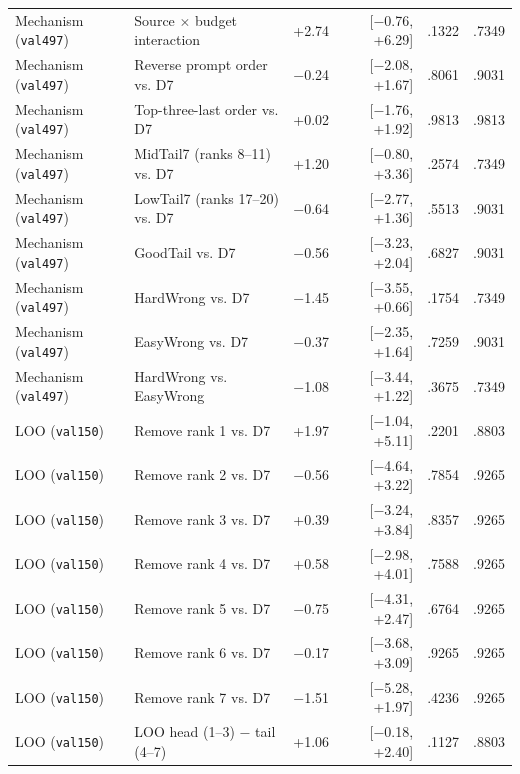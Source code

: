 \documentclass[11pt,a4paper]{article}
\begin{document}
\begin{table}[t]
{\begin{tabular}{llrrrr}
Mechanism (\texttt{val497}) & Source $\times$ budget interaction & +2.74 & [$-$0.76, +6.29] & .1322 & .7349 \\
Mechanism (\texttt{val497}) & Reverse prompt order vs. D7 & $-$0.24 & [$-$2.08, +1.67] & .8061 & .9031 \\
Mechanism (\texttt{val497}) & Top-three-last order vs. D7 & +0.02 & [$-$1.76, +1.92] & .9813 & .9813 \\
Mechanism (\texttt{val497}) & MidTail7 (ranks 8--11) vs. D7 & +1.20 & [$-$0.80, +3.36] & .2574 & .7349 \\
Mechanism (\texttt{val497}) & LowTail7 (ranks 17--20) vs. D7 & $-$0.64 & [$-$2.77, +1.36] & .5513 & .9031 \\
Mechanism (\texttt{val497}) & GoodTail vs. D7 & $-$0.56 & [$-$3.23, +2.04] & .6827 & .9031 \\
Mechanism (\texttt{val497}) & HardWrong vs. D7 & $-$1.45 & [$-$3.55, +0.66] & .1754 & .7349 \\
Mechanism (\texttt{val497}) & EasyWrong vs. D7 & $-$0.37 & [$-$2.35, +1.64] & .7259 & .9031 \\
Mechanism (\texttt{val497}) & HardWrong vs. EasyWrong & $-$1.08 & [$-$3.44, +1.22] & .3675 & .7349 \\
LOO (\texttt{val150}) & Remove rank 1 vs. D7 & +1.97 & [$-$1.04, +5.11] & .2201 & .8803 \\
LOO (\texttt{val150}) & Remove rank 2 vs. D7 & $-$0.56 & [$-$4.64, +3.22] & .7854 & .9265 \\
LOO (\texttt{val150}) & Remove rank 3 vs. D7 & +0.39 & [$-$3.24, +3.84] & .8357 & .9265 \\
LOO (\texttt{val150}) & Remove rank 4 vs. D7 & +0.58 & [$-$2.98, +4.01] & .7588 & .9265 \\
LOO (\texttt{val150}) & Remove rank 5 vs. D7 & $-$0.75 & [$-$4.31, +2.47] & .6764 & .9265 \\
LOO (\texttt{val150}) & Remove rank 6 vs. D7 & $-$0.17 & [$-$3.68, +3.09] & .9265 & .9265 \\
LOO (\texttt{val150}) & Remove rank 7 vs. D7 & $-$1.51 & [$-$5.28, +1.97] & .4236 & .9265 \\
LOO (\texttt{val150}) & LOO head (1--3) $-$ tail (4--7) & +1.06 & [$-$0.18, +2.40] & .1127 & .8803 \\
\bottomrule
\end{tabular}%
}
\end{table}
\end{document}
